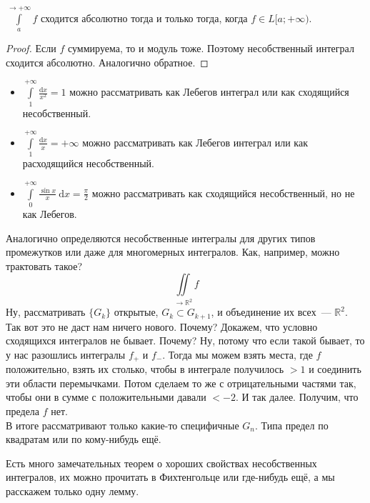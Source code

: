 \documentclass{article}
\begin{document}
    \begin{claim}
        $\int\limits_a^{\to+\infty}f$ сходится абсолютно тогда и только тогда, когда $f\in L[a;+\infty)$.
    \end{claim}
    \begin{proof}
        Если $f$ суммируема, то и модуль тоже. Поэтому несобственный интеграл сходится абсолютно. Аналогично обратное.
    \end{proof}
    \begin{example}
        \begin{itemize}
            \item $\int\limits_1^{+\infty}\frac{\mathrm dx}{x^2}=1$ можно рассматривать как Лебегов интеграл или как сходящийся несобственный.
            \item $\int\limits_1^{+\infty}\frac{\mathrm dx}{x}=+\infty$ можно рассматривать как Лебегов интеграл или как расходящийся несобственный.
            \item $\int\limits_0^{+\infty}\frac{\sin x}{x}~\mathrm dx=\frac\pi2$ можно рассматривать как сходящийся несобственный, но не как Лебегов.
        \end{itemize}
    \end{example}
    \begin{remark}
        Аналогично определяются несобственные интегралы для других типов промежутков или даже для многомерных интегралов. Как, например, можно трактовать такое?
        $$
        \iint\limits_{\to\mathbb R^2}f
        $$
        Ну, рассматривать $\{G_k\}$ открытые, $G_k\subset G_{k+1}$, и объединение их всех~--- $\mathbb R^2$.\\
        Так вот это не даст нам ничего нового. Почему? Докажем, что условно сходящихся интегралов не бывает. Почему? Ну, потому что если такой бывает, то у нас разошлись интегралы $f_+$ и $f_-$. Тогда мы можем взять места, где $f$ положительно, взять их столько, чтобы в интеграле получилось $>1$ и соединить эти области перемычками. Потом сделаем то же с отрицательными частями так, чтобы они в сумме с положительными давали $<-2$. И так далее. Получим, что предела $f$ нет.\\
        В итоге рассматривают только какие-то специфичные $G_n$. Типа предел по квадратам или по кому-нибудь ещё.
    \end{remark}
    \begin{remark}
        Есть много замечательных теорем о хороших свойствах несобственных интегралов, их можно прочитать в Фихтенгольце или где-нибудь ещё, а мы расскажем только одну лемму.
    \end{remark}
\end{document}
